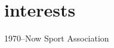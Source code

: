 \documentclass[]{cv-style}          %
\begin{document}
\section{interests}
  \vspace{-0.2cm}

\begin{entrylist}
\entry
{1970--Now}
{Sport}
{Association}
{\vspace{-0.3cm}}
\end{entrylist}

\end{document}
